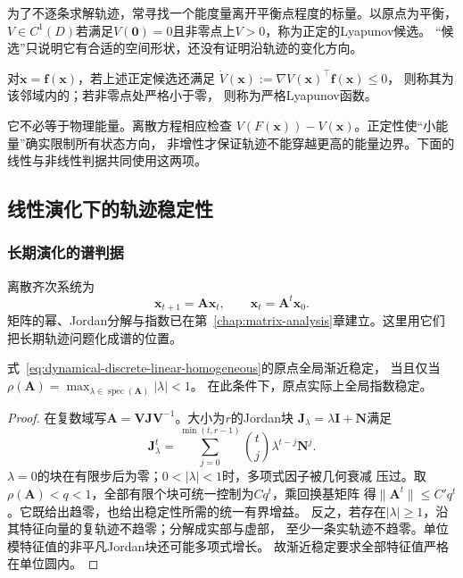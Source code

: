 为了不逐条求解轨迹，常寻找一个能度量离开平衡点程度的标量。以原点为平衡，
$V\in C^1(D)$若满足$V(\bm0)=0$且非零点上$V>0$，称为正定的Lyapunov候选。
“候选”只说明它有合适的空间形状，还没有证明沿轨迹的变化方向。
\begin{definition}[Lyapunov函数]
  \label{def:dynamical-lyapunov-function}
  对$\dot{\bm x}=\bm f(\bm x)$，若上述正定候选还满足
  $\dot V(\bm x):=\nabla V(\bm x)^\top\bm f(\bm x)\leq0$，
  则称其为该邻域内的；若非零点处严格小于零，
  则称为严格Lyapunov函数。
\end{definition}
它不必等于物理能量。离散方程相应检查
$V(F(\bm x))-V(\bm x)$。正定性使“小能量”确实限制所有状态方向，
非增性才保证轨迹不能穿越更高的能量边界。下面的线性与非线性判据共同使用这两项。

\subsection{线性演化下的轨迹稳定性}

\subsubsection{长期演化的谱判据}

离散齐次系统为
\begin{equation}
  \bm x_{t+1}=\bm A\bm x_t,\qquad \bm x_t=\bm A^t\bm x_0.
  \label{eq:dynamical-discrete-linear-homogeneous}
\end{equation}
矩阵的幂、Jordan分解与指数已在第~\ref{chap:matrix-analysis}章建立。这里用它们
把长期轨迹问题化成谱的位置。
\begin{theorem}[离散线性系统的渐近稳定性]
  \label{thm:dynamical-discrete-spectral-stability}
  式~\eqref{eq:dynamical-discrete-linear-homogeneous}的原点全局渐近稳定，
  当且仅当$\rho(\bm A)=\max_{\lambda\in\operatorname{spec}(\bm A)}|\lambda|<1$。
  在此条件下，原点实际上全局指数稳定。
\end{theorem}
\begin{proof}
  在复数域写$\bm A=\bm V\bm J\bm V^{-1}$。大小为$r$的Jordan块
  $\bm J_\lambda=\lambda\bm I+\bm N$满足
  \[
    \bm J_\lambda^t
      =\sum_{j=0}^{\min(t,r-1)}\binom tj\lambda^{t-j}\bm N^j.
  \]
  $\lambda=0$的块在有限步后为零；$0<|\lambda|<1$时，多项式因子被几何衰减
  压过。取$\rho(\bm A)<q<1$，全部有限个块可统一控制为$Cq^t$，乘回换基矩阵
  得$\|\bm A^t\|\leq C' q^t$。它既给出趋零，也给出稳定性所需的统一有界增益。
  反之，若存在$|\lambda|\geq1$，沿其特征向量的复轨迹不趋零；分解成实部与虚部，
  至少一条实轨迹不趋零。单位模特征值的非平凡Jordan块还可能多项式增长。
  故渐近稳定要求全部特征值严格在单位圆内。
\end{proof}

